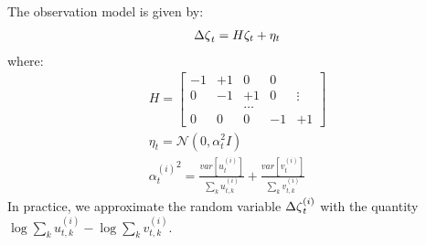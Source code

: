 \documentclass{article}
\begin{document}
\bigskip
The observation model is given by:
\begin{align}
    {\Delta \zeta}_t = H \zeta_t + \eta_t
\end{align}
where:
\begin{align}
H=\left[ \begin{array}{rrrrr}
    -1 & +1 &  0     &  0 &        \\
     0 & -1 & +1     &  0 & \vdots \\
       &    & \ldots &    &        \\
     0 &  0 &  0     & -1 & +1
\end{array} \right] \nonumber \\
\eta_t = \mathcal{N}(0, \alpha_t^2 I) \nonumber \\
{\alpha_t^{(i)}}^2 = \frac {var[u_t^{(i)}]} {\sum_k u_{t,k}^{(i)}} +
                     \frac {var[v_t^{(i)}]} {\sum_k v_{t,k}^{(i)}} \nonumber
\end{align}
In practice, we approximate the random variable ${\Delta \zeta}_t^{(i)}$ with the quantity
$\log \sum_k u_{t,k}^{(i)} - \log \sum_k v_{t,k}^{(i)}$. 
\end{document}
